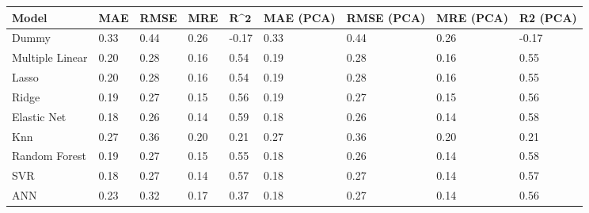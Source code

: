 \begin{table}
\centering
\label{table:iri_reg_pred}
\begin{tabular}{lllllllll}
\toprule
 \textbf{Model} & \textbf{MAE} & \textbf{RMSE} & \textbf{MRE} & $\textbf{R^2}$ & \textbf{MAE (PCA)} & \textbf{RMSE (PCA)} & \textbf{MRE (PCA)} & \textbf{R2 (PCA)} \\
\midrule
          Dummy &         0.33 &          0.44 &         0.26 &          -0.17 &               0.33 &                0.44 &               0.26 &             -0.17 \\
Multiple Linear &         0.20 &          0.28 &         0.16 &           0.54 &               0.19 &                0.28 &               0.16 &              0.55 \\
          Lasso &         0.20 &          0.28 &         0.16 &           0.54 &               0.19 &                0.28 &               0.16 &              0.55 \\
          Ridge &         0.19 &          0.27 &         0.15 &           0.56 &               0.19 &                0.27 &               0.15 &              0.56 \\
    Elastic Net &         0.18 &          0.26 &         0.14 &           0.59 &               0.18 &                0.26 &               0.14 &              0.58 \\
            Knn &         0.27 &          0.36 &         0.20 &           0.21 &               0.27 &                0.36 &               0.20 &              0.21 \\
  Random Forest &         0.19 &          0.27 &         0.15 &           0.55 &               0.18 &                0.26 &               0.14 &              0.58 \\
            SVR &         0.18 &          0.27 &         0.14 &           0.57 &               0.18 &                0.27 &               0.14 &              0.57 \\
            ANN &         0.23 &          0.32 &         0.17 &           0.37 &               0.18 &                0.27 &               0.14 &              0.56 \\
\bottomrule
\end{tabular}
\end{table}
